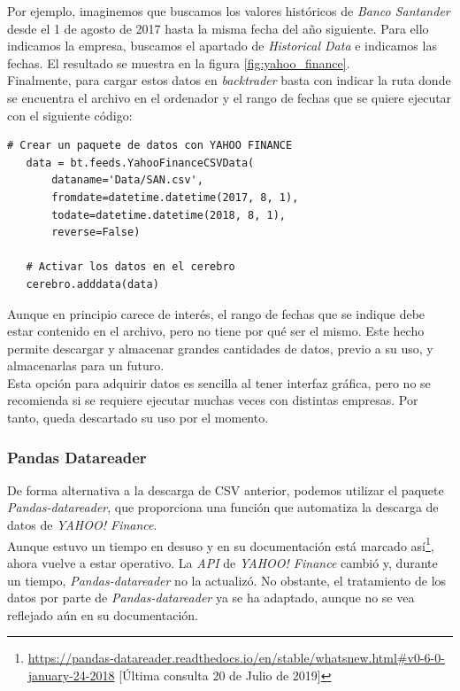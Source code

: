 		Por ejemplo, imaginemos que buscamos los valores hist\'oricos de \textit{Banco Santander} desde el 1 de agosto de 2017 hasta la misma fecha del a\~{n}o siguiente. Para ello indicamos la empresa, buscamos el apartado de \textit{Historical Data} e indicamos las fechas. El resultado se muestra en la figura \ref{fig:yahoo_finance}.\\
		
		Finalmente, para cargar estos datos en \textit{backtrader} basta con indicar la ruta donde se encuentra el archivo en el ordenador y el rango de fechas que se quiere ejecutar con el siguiente c\'odigo:\\
		

		\begin{lstlisting}[basicstyle=\tiny]
   # Crear un paquete de datos con YAHOO FINANCE
   data = bt.feeds.YahooFinanceCSVData(
	   dataname='Data/SAN.csv',
	   fromdate=datetime.datetime(2017, 8, 1),
	   todate=datetime.datetime(2018, 8, 1),
	   reverse=False)
   
   # Activar los datos en el cerebro
   cerebro.adddata(data)
		\end{lstlisting}

		Aunque en principio carece de inter\'es, el rango de fechas que se indique debe estar contenido en el archivo, pero no tiene por qu\'e ser el mismo. Este hecho permite descargar y almacenar grandes cantidades de datos, previo a su uso, y almacenarlas para un futuro.\\
		
		Esta opci\'on para adquirir datos es sencilla al tener interfaz gr\'afica, pero no se recomienda si se requiere ejecutar muchas veces con distintas empresas. Por tanto, queda descartado su uso por el momento.\\


    \subsubsection{Pandas Datareader}
    De forma alternativa a la descarga de CSV anterior, podemos utilizar el paquete \textit{Pandas-datareader}, que proporciona una funci\'on que automatiza la descarga de datos de \textit{YAHOO! Finance}.\\ 
    
    Aunque estuvo un tiempo en desuso y en su documentaci\'on est\'a marcado as\'i\footnote{\url{https://pandas-datareader.readthedocs.io/en/stable/whatsnew.html\#v0-6-0-january-24-2018} [\'Ultima consulta 20 de Julio de 2019]}, ahora vuelve a estar operativo. La \textit{API} de \textit{YAHOO! Finance} cambi\'o y, durante un tiempo, \textit{Pandas-datareader} no la actualiz\'o. No obstante, el tratamiento de los datos por parte de \textit{Pandas-datareader} ya se ha adaptado, aunque no se vea reflejado a\'un en su documentaci\'on.\\
    
